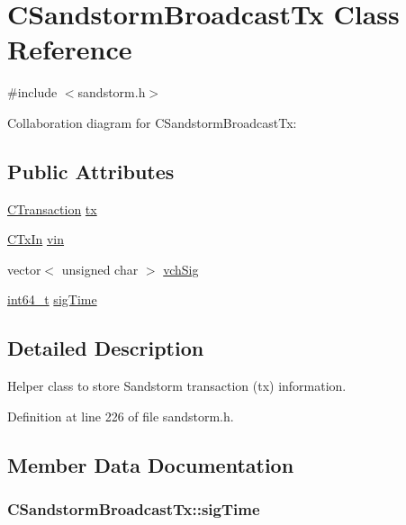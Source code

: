 \hypertarget{class_c_sandstorm_broadcast_tx}{}\section{C\+Sandstorm\+Broadcast\+Tx Class Reference}
\label{class_c_sandstorm_broadcast_tx}


{\ttfamily \#include $<$sandstorm.\+h$>$}



Collaboration diagram for C\+Sandstorm\+Broadcast\+Tx\+:
\subsection*{Public Attributes}
\begin{DoxyCompactItemize}
\item 
\hyperlink{class_c_transaction}{C\+Transaction} \hyperlink{class_c_sandstorm_broadcast_tx_ace6eee4d92b7fd4d98f8703d54d9b601}{tx}
\item 
\hyperlink{class_c_tx_in}{C\+Tx\+In} \hyperlink{class_c_sandstorm_broadcast_tx_a7aa70aaddcdcc0a56c84f2a6e43e96bd}{vin}
\item 
vector$<$ unsigned char $>$ \hyperlink{class_c_sandstorm_broadcast_tx_ad75aca79f3783c7f1e3f6a58f5ddc737}{vch\+Sig}
\item 
\hyperlink{stdint_8h_adec1df1b8b51cb32b77e5b86fff46471}{int64\+\_\+t} \hyperlink{class_c_sandstorm_broadcast_tx_af0add2ec08b732bff4cae62031a53061}{sig\+Time}
\end{DoxyCompactItemize}


\subsection{Detailed Description}
Helper class to store Sandstorm transaction (tx) information. 

Definition at line 226 of file sandstorm.\+h.



\subsection{Member Data Documentation}
\hypertarget{class_c_sandstorm_broadcast_tx_af0add2ec08b732bff4cae62031a53061}{}
\subsubsection[{sig\+Time}]{ C\+Sandstorm\+Broadcast\+Tx\+::sig\+Time}\label{class_c_sandstorm_broadcast_tx_af0add2ec08b732bff4cae62031a53061}


